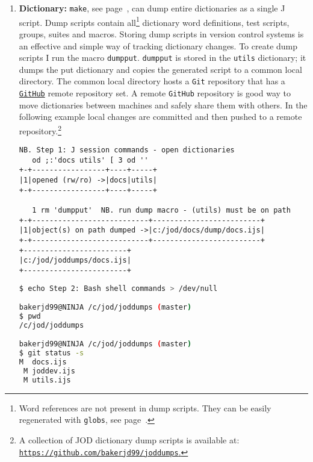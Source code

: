 \begin{enumerate}
\item \textbf{Dictionary:}\label{it:dictlev} \texttt{make}, see page~\pageref{ss:make}, can dump entire
dictionaries as a single J script. Dump scripts contain all\footnote{Word references 
are not present in dump scripts. They can
be easily regenerated with \texttt{globs}, see page~\pageref{ss:globs}.} dictionary word definitions,
test scripts, groups, suites and macros. Storing dump scripts in version control systems is
an effective and simple way of tracking dictionary changes.  To create dump scripts I run
the macro \texttt{dumpput}.
\texttt{dumpput} is stored in the \texttt{utils} dictionary; it dumps the put dictionary and
copies the generated script to a common local directory. The common local directory
hosts a \texttt{Git} repository that has a \href{https://github.com/bakerjd99/joddumps}{\texttt{GitHub}} remote repository set.
A remote \texttt{GitHub}  repository is good way to move dictionaries between machines
and safely share them with others. In the following example local changes
are committed and then pushed to a remote repository.\footnote{A collection of JOD dictionary dump scripts is available at: \href{https://github.com/bakerjd99/joddumps}{\texttt{https://github.com/bakerjd99/joddumps}.}
}


\begin{lstlisting}[frame=single,framerule=0pt,basicstyle=\ttfamily\footnotesize]
   NB. Step 1: J session commands - open dictionaries
   od ;:'docs utils' [ 3 od ''
+-+-----------------+----+-----+
|1|opened (rw/ro) ->|docs|utils|
+-+-----------------+----+-----+
   
   1 rm 'dumpput'  NB. run dump macro - (utils) must be on path
+-+---------------------------+-------------------------+
|1|object(s) on path dumped ->|c:/jod/docs/dump/docs.ijs|
+-+---------------------------+-------------------------+
+------------------------+
|c:/jod/joddumps/docs.ijs|
+------------------------+
\end{lstlisting}

\begin{lstlisting}[language=bash,frame=single,framerule=0pt
,basicstyle=\ttfamily\footnotesize,backgroundcolor=\color{CodeBackGround}]
$ echo Step 2: Bash shell commands > /dev/null

bakerjd99@NINJA /c/jod/joddumps (master)
$ pwd
/c/jod/joddumps

bakerjd99@NINJA /c/jod/joddumps (master)
$ git status -s
M  docs.ijs
 M joddev.ijs
 M utils.ijs


\end{lstlisting}
\end{enumerate}

